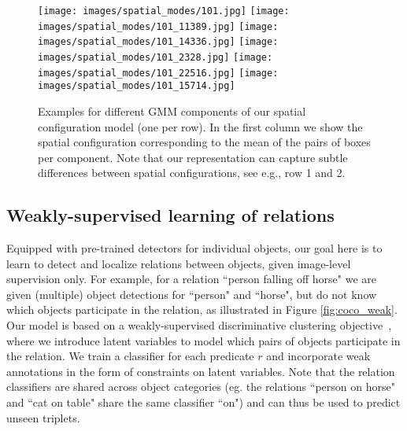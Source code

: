 \documentclass[10pt,twocolumn,letterpaper]{article}
\begin{document}
\begin{figure*}[t]
    \begin{minipage}[b]{\textwidth}
       \texttt{[image: images/spatial\_modes/101.jpg]}
       \texttt{[image: images/spatial\_modes/101\_11389.jpg]}
       \texttt{[image: images/spatial\_modes/101\_14336.jpg]}
       \texttt{[image: images/spatial\_modes/101\_2328.jpg]}
       \texttt{[image: images/spatial\_modes/101\_22516.jpg]}
       \texttt{[image: images/spatial\_modes/101\_15714.jpg]}
       \vspace{-0.5ex}
    \end{minipage}   
    \setlength\abovecaptionskip{0.3cm}
    \caption{%
      Examples for different GMM components of our spatial configuration model (one
      per row). In the first column we show the spatial configuration
      corresponding to the mean of the pairs of boxes per
      component. Note that our representation can capture subtle
      differences between spatial configurations, see e.g., row 1 and 2.} 
      \vspace{-.4cm}
    \label{GMM_components}
\end{figure*}


\subsection{Weakly-supervised learning of relations}
\label{model}


Equipped with pre-trained detectors for individual objects, our goal here is to learn to detect and localize relations between objects, given image-level supervision only. For example, for a relation ``person falling off horse" we are given (multiple) object detections for ``person" and ``horse", but do not know which objects participate in the relation, as illustrated in Figure \ref{fig:coco_weak}. Our model is based on a weakly-supervised discriminative clustering objective~\cite{bach2008diffrac}, where we introduce latent variables to model which pairs of objects participate in the relation. We train a classifier for each predicate $r$ and incorporate weak annotations in the form of constraints on latent variables. Note that the relation classifiers are shared across object categories (eg. the relations ``person on horse" and ``cat on table" share the same classifier ``on") and can thus be used to predict unseen triplets.
\end{document}

